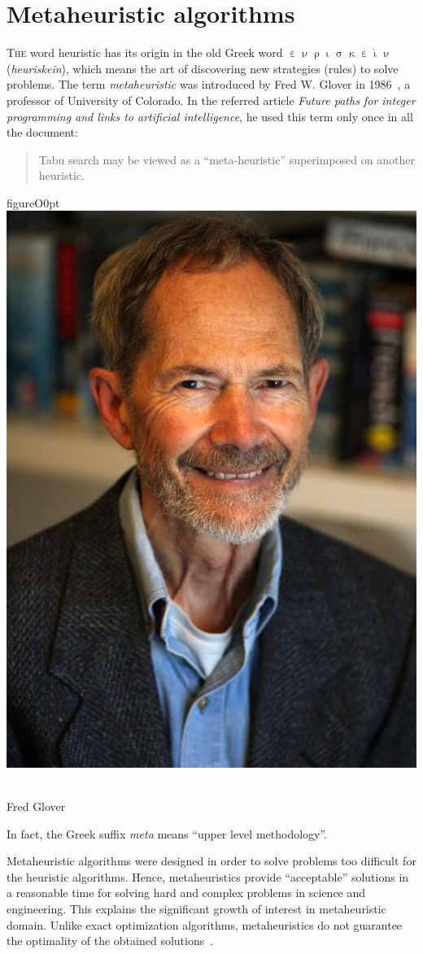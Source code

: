 \chapter{Metaheuristic algorithms}
\label{chap:Metaheuristic}

\lettrine[lines=3]{\color{BrickRed}T}{he } word heuristic has its origin in the old Greek word $\upepsilon \upnu \uprho \upiota \upsigma \upkappa \upepsilon \acute{\upiota} \upnu  $ (\textit{heuriskein}), which means the art of discovering new strategies (rules) to solve problems. The term \textit{metaheuristic} was introduced by Fred W. Glover in 1986~\cite[p. 541]{Glover1986}, a professor of University of Colorado. In the referred article \textit{Future paths for integer programming and links to artificial intelligence}, he used this term only once in all the document: \begin{quote}\small
	Tabu search may be viewed as a “meta-heuristic” superimposed on another heuristic.
\end{quote}

\begin{wrapfloat}{figure}{O}{0pt}
	\includegraphics[width=.15\textwidth]{Fred_Glover.jpeg}
	\caption[Fred Glover]{\\Fred Glover}
\end{wrapfloat}


\noindent In fact, the Greek suffix \textit{meta} means “upper level methodology''. 


Metaheuristic algorithms were designed in order to solve problems too difficult for the heuristic algorithms. Hence, metaheuristics provide “acceptable” solutions in a reasonable time for solving hard and complex problems in science and engineering.  This explains the significant growth of interest in metaheuristic domain. Unlike exact optimization
algorithms, metaheuristics do not guarantee the optimality of the obtained solutions~\cite{Talbi_2009}.



